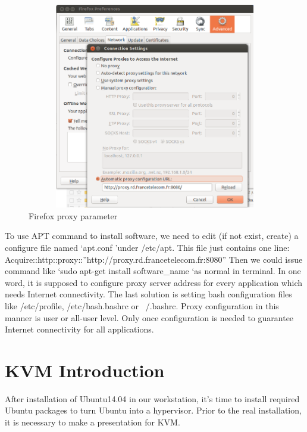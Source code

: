 \begin{figure}[htbp]
	\centering
		\includegraphics[width=12cm, height= 9cm ]{Figures/Figure6.png}
	\caption[Firefox proxy parameter]{Firefox proxy parameter}
	\label{fig:Firefox proxy parameter}
\end{figure}

To use APT command to install software, we need to edit (if not exist, create) a configure file named \lq apt.conf \rq under /etc/apt. This file just contains one line: Acquire::http::proxy::”http://proxy.rd.francetelecom.fr:8080”
Then we could issue command like \lq sudo apt-get install software\_name \lq as normal in terminal. In one word, it is supposed to configure proxy server address for every application which needs Internet connectivity.
The last solution is setting bash configuration files like /etc/profile, /etc/bash.bashrc or ~/.bashrc. Proxy configuration in this manner is user or all-user level. Only once configuration is needed to guarantee Internet connectivity for all applications.


\section{KVM Introduction}

After installation of Ubuntu14.04 in our workstation, it’s time to install required Ubuntu packages to turn Ubuntu into a hypervisor. Prior to the real installation, it is necessary to make a presentation for KVM.

